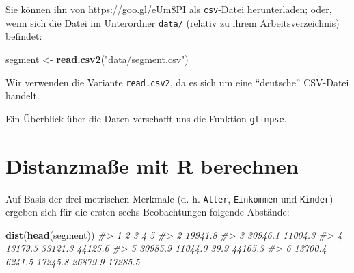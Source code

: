 \documentclass[12pt,ngerman,]{book}
\newenvironment{Shaded}{\begin{snugshade}}{\end{snugshade}}
\newcommand{\KeywordTok}[1]{\textcolor[rgb]{0.13,0.29,0.53}{\textbf{{#1}}}}
\newcommand{\StringTok}[1]{\textcolor[rgb]{0.31,0.60,0.02}{{#1}}}
\newcommand{\CommentTok}[1]{\textcolor[rgb]{0.56,0.35,0.01}{\textit{{#1}}}}
\newcommand{\NormalTok}[1]{{#1}}
\renewenvironment{Shaded}{\begin{kframe}}{\end{kframe}}
\begin{document}
Sie können ihn von \url{https://goo.gl/eUm8PI} als \texttt{csv}-Datei
herunterladen; oder, wenn sich die Datei im Unterordner \texttt{data/}
(relativ zu ihrem Arbeitsverzeichnis) befindet:

\begin{Shaded}
\begin{Highlighting}[]
\NormalTok{segment <-}\StringTok{ }\KeywordTok{read.csv2}\NormalTok{(}\StringTok{"data/segment.csv"}\NormalTok{)}
\end{Highlighting}
\end{Shaded}

Wir verwenden die Variante \texttt{read.csv2}, da es sich um eine
``deutsche'' CSV-Datei handelt.

Ein Überblick über die Daten verschafft uns die Funktion
\texttt{glimpse}.

\begin{Shaded}
\end{Shaded}

\section{Distanzmaße mit R berechnen}\label{distanzmae-mit-r-berechnen}

Auf Basis der drei metrischen Merkmale (d. h. \texttt{Alter},
\texttt{Einkommen} und \texttt{Kinder}) ergeben sich für die ersten
sechs Beobachtungen folgende Abstände:

\begin{Shaded}
\begin{Highlighting}[]
\KeywordTok{dist}\NormalTok{(}\KeywordTok{head}\NormalTok{(segment))}
\CommentTok{#>         1       2       3       4       5}
\CommentTok{#> 2 19941.8                                }
\CommentTok{#> 3 30946.1 11004.3                        }
\CommentTok{#> 4 13179.5 33121.3 44125.6                }
\CommentTok{#> 5 30985.9 11044.0    39.9 44165.3        }
\CommentTok{#> 6 13700.4  6241.5 17245.8 26879.9 17285.5}
\end{Highlighting}
\end{Shaded}
\end{document}
